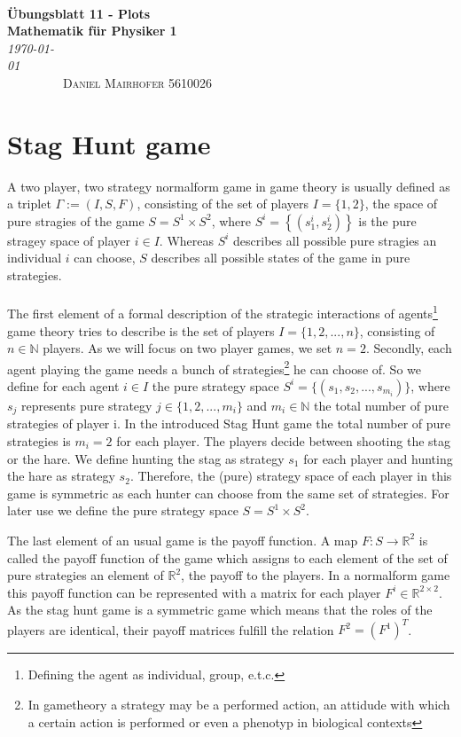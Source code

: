 \documentclass[10pt]{article}
\newcommand{\natnumb}{\mathbb{N}}
\newcommand{\realnumb}{\mathbb{R}}
\begin{document}
{\noindent\Huge\bf  \\[0.5\baselineskip] {\selectfont  Übungsblatt 11 - Plots}         }\\[2\baselineskip] %
{ {\bf {}\selectfont Mathematik für Physiker 1}\\ {\textit{\selectfont \today   }}}~~~~~~~~~~~~~~~~~~~~~~~~~~~~~~~~~~~~~~~~~~~~~~~~~~~~~~~~~~~~~~~~~~~~~~~~~~~~~\
{\textsc{Daniel Mairhofer 5610026}}%
\\[1.4\baselineskip] 
    
\section{Stag Hunt game}
A two player, two strategy normalform game in game theory is usually defined 
as a triplet $\Gamma := (I,S,F)$, consisting of the set of players 
$I = \{1,2\}$, the space of pure stragies of the game $S= S^1 \times S^2$,
where $S^i = \left\{\left(s_1^i, s_2^i\right)\right\}$ is the pure stragey 
space of player $ i \in I$. Whereas $S^i$ describes all possible pure stragies
an individual $i$ can choose, $S$ describes all possible states of the game
in pure strategies.
\\
\\

The first element of a formal description of the strategic interactions of 
agents\footnote{Defining the agent as individual, group, e.t.c.} game theory
tries to describe is the set of players $I = \{1,2,...,n\}$, consisting of 
$ n \in \natnumb$ players. As we will focus on two player games, we set $n=2$.
Secondly, each agent playing the game needs a bunch of strategies\footnote{
In gametheory a strategy may be a performed action, an attidude with which a 
certain action is performed or even a phenotyp in biological contexts} he can
choose of. So we define for each agent 
$i \in I$ the pure strategy space 
$S^i = \{(s_1,s_2,...,s_{m_i})\}$, where $s_{j}$ represents pure strategy $j \in 
\{1,2,...,m_i\}$ and $m_i \in \natnumb$ the total
number of pure strategies of player i. In the introduced Stag Hunt game the 
total number of pure strategies is $m_i = 2$ for each player. 
The players decide between shooting the stag or the hare. 
We define hunting the stag as strategy $s_1$ for each player and hunting the 
hare as strategy $s_2$. Therefore, the (pure) strategy space of each player
in this game is symmetric as each hunter can choose from the same set of 
strategies. For later use we define the pure strategy space $S = S^1 \times 
S^2$. 

The last element of an usual game is the payoff function. A map $F:S \rightarrow
\realnumb^2$ is called the payoff function of the game which assigns to each element of
the set of pure strategies an element of $\realnumb^2$, the payoff to the players. 
In a normalform game this payoff function can be represented with a matrix for
each player $F^i \in \realnumb^{2 \times 2}$. As the stag hunt game is a
symmetric game which means that the roles of the players are identical, their
payoff matrices fulfill the relation $F^2 = (F^1)^T$. 
\end{document}
